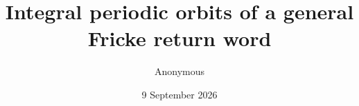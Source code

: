 \documentclass[11pt]{article}
\title{Integral periodic orbits of a general Fricke return word}
\author{Anonymous}
\date{9 September 2026}
\begin{document}
\maketitle
\begin{abstract}

\end{abstract}








\clearpage


\end{document}
